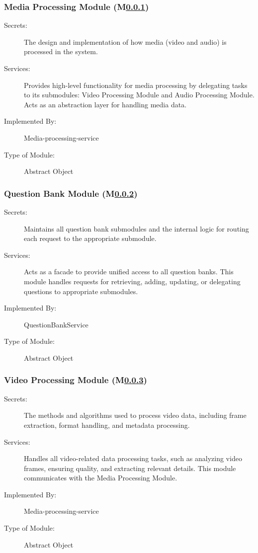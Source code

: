 \documentclass[12pt, titlepage]{article}
\newcounter{mnum}
\newcommand{\mref}[1]{M\ref{#1}}
\begin{document}
\subsubsection{Media Processing Module (\mref{mMediaProcessing})}
\label{mMediaProcessing}

\begin{description}
\item[Secrets:] The design and implementation of how media (video and audio) is processed in the system.
\item[Services:] Provides high-level functionality for media processing by delegating tasks to its submodules: Video Processing Module and Audio Processing Module. Acts as an abstraction layer for handling media data.
\item[Implemented By:] Media-processing-service
\item[Type of Module:]  Abstract Object
\end{description}

\subsubsection{Question Bank Module (\mref{mQuestionBank})}
\label{mQuestionBank}

\begin{description}
\item[Secrets:] Maintains all question bank submodules and the internal logic for routing each request to the appropriate submodule.
\item[Services:]Acts as a facade to provide unified access to all question banks.
This module handles requests for retrieving, adding, updating, or delegating questions 
to appropriate submodules.
\item[Implemented By:] QuestionBankService
\item[Type of Module:] Abstract Object
\end{description}

\subsubsection{Video Processing Module (\mref{mVideoProcessing})}
\label{mVideoProcessing}

\begin{description}
\item[Secrets:] The methods and algorithms used to process video data, including frame extraction, format handling, and metadata processing.
\item[Services:] Handles all video-related data processing tasks, such as analyzing video frames, ensuring quality, and extracting relevant details. This module communicates with the Media Processing Module.
\item[Implemented By:] Media-processing-service
\item[Type of Module:]  Abstract Object
\end{description}
\end{document}
